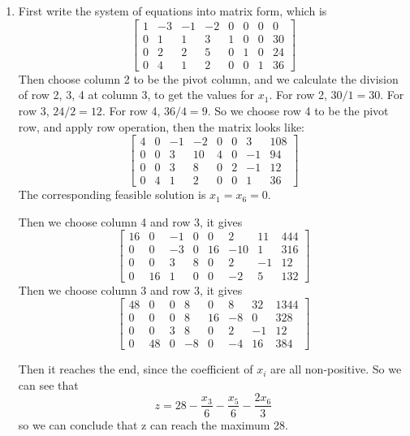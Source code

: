 \documentclass[12pt, a4paper]{article}
\begin{document}
\begin{enumerate}
\begin{enumerate}[a)]
    \end{enumerate}
    \item First write the system of equations into matrix form, which is 
          \[
            \begin{bmatrix}
                1 & -3 & -1 & -2 & 0 & 0 & 0 & 0\\
                0 &  1 &  1 &  3 & 1 & 0 & 0 & 30\\
                0 &  2 &  2 &  5 & 0 & 1 & 0 & 24\\
                0 &  4 &  1 &  2 & 0 & 0 & 1 & 36
            \end{bmatrix}    
          \]
          Then choose column 2 to be the pivot column, and we calculate the division of row 2, 3, 4 at column 3,
           to get the values for $x_1$. For row 2, $30/1 = 30$. For row 3, $24/2 = 12$. For row 4, $36/4 = 9$. 
           So we choose row 4 to be the pivot row, and apply row operation, then the matrix looks like:
           \[
            \begin{bmatrix}
                4 &  0 & -1 & -2 & 0 & 0 & 3 & 108\\
                0 &  0 & 3 & 10 & 4 & 0 & -1 & 94\\
                0 &  0 & 3 & 8 & 0 & 2 & -1 & 12\\
                0 &  4 & 1 & 2 & 0 & 0 &  1 & 36
            \end{bmatrix}    
           \]
           The corresponding feasible solution is $x_1 = x_6 = 0$.
           
            Then we choose column 4 and row 3, it gives
            \[
            \begin{bmatrix}
                16 &  0 & -1 & 0 & 0 & 2 & 11 & 444\\
                0 &  0 & -3 & 0 & 16 & -10 & 1 & 316\\
                0 &  0 & 3 & 8 & 0 & 2 & -1 & 12\\
                0 &  16 & 1 & 0 & 0 & -2 &  5 & 132
            \end{bmatrix}
            \]
           Then we choose column 3 and row 3, it gives
           \[
            \begin{bmatrix}
                48 &  0 & 0 & 8 & 0 & 8 & 32 & 1344\\
                0 &  0 & 0 & 8 & 16 & -8 & 0 & 328\\
                0 &  0 & 3 & 8 & 0 & 2 & -1 & 12\\
                0 &  48 & 0 & -8 & 0 & -4 &  16 & 384
            \end{bmatrix}
            \]

           Then it reaches the end, since the coefficient of $x_i$ are all non-positive. So we can see that
           \[z = 28 - \frac{x_3}{6} - \frac{x_5}{6} - \frac{2x_6}{3} \]
           so we can conclude that z can reach the maximum 28.
\end{enumerate}
\end{document}
